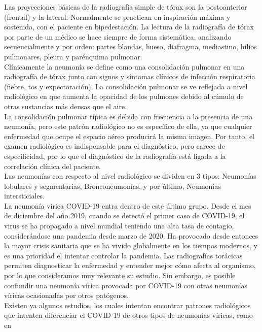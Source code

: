 \documentclass[11pt,a4paper]{article}
\theoremstyle{definition}
\begin{document}
Las proyecciones básicas de la radiografía simple de tórax son la postoanterior (frontal) y la lateral.  Normalmente se practican en inspiración máxima y sostenida,  con el paciente en bipedestación.  La lectura de la radiografía de tórax por parte de un médico se hace siempre de forma sistemática, analizando secuencialmente y por orden: partes blandas, hueso, diafragma, mediastino, hilios pulmonares, pleura y parénquima pulmonar.\\

Clínicamente la neumonía se define como una consolidación pulmonar en una radiografía de tórax junto con signos y síntomas clínicos de infección respiratoria (fiebre, tos y expectoración). La consolidación pulmonar se ve reflejada a nivel radiológico en que aumenta la opacidad de los pulmones debido al cúmulo de otras sustancias más densas que el aire.\\

La consolidación pulmonar típica es debida con frecuencia a la presencia de una neumonía, pero este patrón radiológico no es específico de ella, ya que cualquier enfermedad que ocupe el espacio aéreo producirá la misma imagen. Por tanto, el examen radiológico es indispensable para el diagnóstico, pero carece de especificidad, por lo que el diagnóstico de la radiografía está ligada a la correlación clínica del paciente.\\

Las neumonías con respecto al nivel radiológico se dividen en 3 tipos: Neumonías lobulares y segmentarias, Bronconeumonías, y por último, Neumonías intersticiales. \\

La neumonía vírica COVID-19 entra dentro de este último grupo.  Desde el mes de diciembre del año 2019,  cuando se detectó el primer caso de COVID-19,  el virus se ha propagado a nivel mundial teniendo una alta tasa de contagio, considerándose una pandemia desde marzo de 2020.  Ha provocado desde entonces la mayor crisis sanitaria que se ha vivido globalmente en los tiempos modernos, y es una prioridad el intentar controlar la pandemia. Las radiografías torácicas permiten diagnosticar la enfermedad y entender mejor cómo afecta al organismo, por lo que consideramos muy relevante su estudio.  Sin embargo,  es posible confundir una neumonía vírica provocada por COVID-19 con otras neumonías víricas ocasionadas por otros patógenos. \\

Existen ya algunos estudios, los cuales intentan encontrar patrones radiológicos que intenten diferenciar el COVID-19 de otros tipos de neumonías víricas, como en \cite{diferencias1, diferencias2, diferencias3}\\
\end{document}
